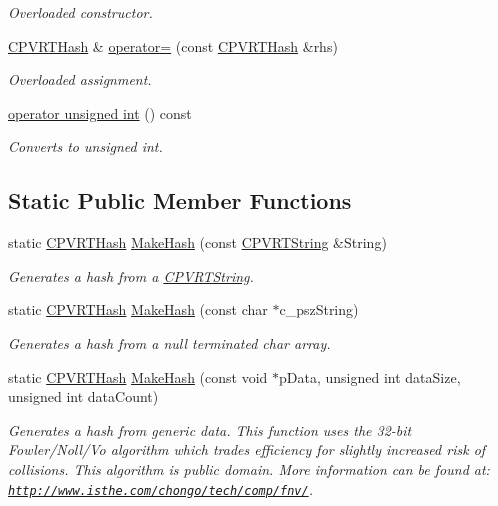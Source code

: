 \begin{DoxyCompactItemize}
\begin{DoxyCompactList}\small\item\em Overloaded constructor. \end{DoxyCompactList}\item 
\hyperlink{class_c_p_v_r_t_hash}{C\+P\+V\+R\+T\+Hash} \& \hyperlink{class_c_p_v_r_t_hash_a49aacf3d894db1ea5259d2b041c3d44a}{operator=} (const \hyperlink{class_c_p_v_r_t_hash}{C\+P\+V\+R\+T\+Hash} \&rhs)
\begin{DoxyCompactList}\small\item\em Overloaded assignment. \end{DoxyCompactList}\item 
\hyperlink{class_c_p_v_r_t_hash_a023a35315f11cf42013e4b9e6523d824}{operator unsigned int} () const 
\begin{DoxyCompactList}\small\item\em Converts to unsigned int. \end{DoxyCompactList}\end{DoxyCompactItemize}
\subsection*{Static Public Member Functions}
\begin{DoxyCompactItemize}
\item 
static \hyperlink{class_c_p_v_r_t_hash}{C\+P\+V\+R\+T\+Hash} \hyperlink{class_c_p_v_r_t_hash_ad95843d27ea7921d472d5a5bd70aaa96}{Make\+Hash} (const \hyperlink{class_c_p_v_r_t_string}{C\+P\+V\+R\+T\+String} \&String)
\begin{DoxyCompactList}\small\item\em Generates a hash from a \hyperlink{class_c_p_v_r_t_string}{C\+P\+V\+R\+T\+String}. \end{DoxyCompactList}\item 
static \hyperlink{class_c_p_v_r_t_hash}{C\+P\+V\+R\+T\+Hash} \hyperlink{class_c_p_v_r_t_hash_af6a8592b7b957b57c8b203b100995f8f}{Make\+Hash} (const char $\ast$c\+\_\+psz\+String)
\begin{DoxyCompactList}\small\item\em Generates a hash from a null terminated char array. \end{DoxyCompactList}\item 
static \hyperlink{class_c_p_v_r_t_hash}{C\+P\+V\+R\+T\+Hash} \hyperlink{class_c_p_v_r_t_hash_a6afdeb15da74299813c49dd7a4655a92}{Make\+Hash} (const void $\ast$p\+Data, unsigned int data\+Size, unsigned int data\+Count)
\begin{DoxyCompactList}\small\item\em Generates a hash from generic data. This function uses the 32-\/bit Fowler/\+Noll/\+Vo algorithm which trades efficiency for slightly increased risk of collisions. This algorithm is public domain. More information can be found at\+: \href{http://www.isthe.com/chongo/tech/comp/fnv/}{\tt http\+://www.\+isthe.\+com/chongo/tech/comp/fnv/}. \end{DoxyCompactList}\end{DoxyCompactItemize}


